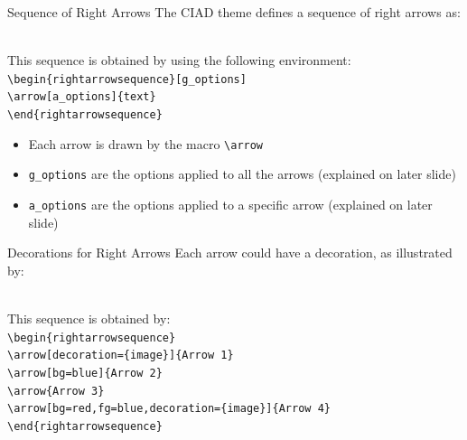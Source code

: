 \documentclass[english,sectioncirclenumberstyle]{ciadbeamer}
\begin{document}
\begin{frame}{Sequence of Right Arrows}
	The CIAD theme defines a sequence of right arrows as:
	\begin{rightarrowsequence}
	\end{rightarrowsequence} \\[.5cm]
	This sequence is obtained by using the following environment: \\
	\texttt{{\textbackslash}begin\{rightarrowsequence\}[g\_options]} \\
	\hspace{.5cm}\texttt{{\textbackslash}arrow[a\_options]\{text\}} \\
	\texttt{{\textbackslash}end\{rightarrowsequence\}}
	
	\begin{itemize}
	\item Each arrow is drawn by the macro \texttt{{\textbackslash}arrow}
	\item \texttt{g\_options} are the options applied to all the arrows (explained on later slide)
	\item \texttt{a\_options} are the options applied to a specific arrow (explained on later slide)
	\end{itemize}
\end{frame}

\begin{frame}{Decorations for Right Arrows}
	\smaller
	Each arrow could have a decoration, as illustrated by:
	\begin{rightarrowsequence}
	\end{rightarrowsequence} \\[.5cm]
	This sequence is obtained by: \\
	\texttt{{\textbackslash}begin\{rightarrowsequence\}} \\
	\hspace{.5cm}\texttt{{\textbackslash}arrow[decoration=\{image\}]\{Arrow 1\}} \\
	\hspace{.5cm}\texttt{{\textbackslash}arrow[bg=blue]\{Arrow 2\}} \\
	\hspace{.5cm}\texttt{{\textbackslash}arrow\{Arrow 3\}} \\
	\hspace{.5cm}\texttt{{\textbackslash}arrow[bg=red,fg=blue,decoration=\{image\}]\{Arrow 4\}} \\
	\texttt{{\textbackslash}end\{rightarrowsequence\}}
\end{frame}
\end{document}
